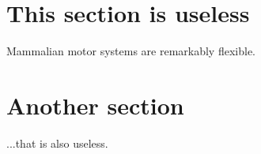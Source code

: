 \documentclass[a4paper]{article}
\begin{document}
\maketitle
\tableofcontents


\section{This section is useless}

Mammalian motor systems are remarkably flexible.


\section{Another section}

...that is also useless.


% 
% 
\end{document}
